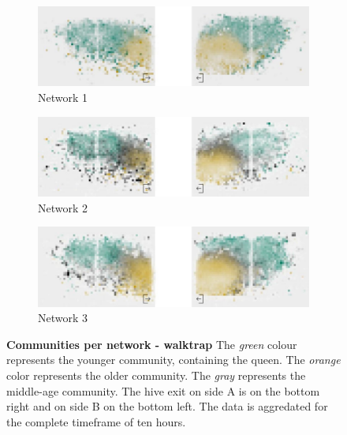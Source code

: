 \begin{figure}[htb]
	\centering
	\begin{subfigure}[b]{1.0\textwidth}
		\centering
		\includegraphics[width=\textwidth]{Figures/wt_network1}
		\caption[Network 1]{Network 1}
		\label{fig:wt1}
		\vspace*{5mm}
	\end{subfigure}
	\begin{subfigure}[b]{1.0\textwidth}
		\includegraphics[width=\textwidth]{Figures/wt_network2}
		\caption[Network 2]{Network 2}
		\label{fig:wt2}
		\vspace*{5mm}
	\end{subfigure}
	\begin{subfigure}[b]{1.0\textwidth}
		\includegraphics[width=\textwidth]{Figures/wt_network3}
		\caption[Network 3]{Network 3}
		\label{fig:wt3}
		\vspace*{5mm}
	\end{subfigure}
	\caption[Communities per network - walktrap]{\textbf{Communities per network - walktrap} The \emph{green} colour represents the younger community, containing the queen. The \emph{orange} color represents the older community. The \emph{gray} represents the middle-age community. The hive exit on side A is on the bottom right and on side B on the bottom left. The data is aggredated for the complete timeframe of ten hours.}
	\label{fig:communitiesPerNetworkWT}
\end{figure}


